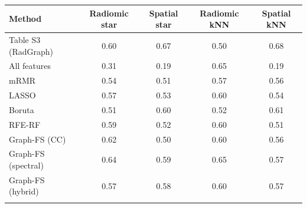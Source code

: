 \begin{tabular}{@{}lcccc@{}}
\toprule
Method & Radiomic star & Spatial star & Radiomic kNN & Spatial kNN \\
\midrule
Table S3 (RadGraph) & 0.60 & 0.67 & 0.50 & 0.68 \\
All features & 0.31 & 0.19 & 0.65 & 0.19 \\
mRMR & 0.54 & 0.51 & 0.57 & 0.56 \\
LASSO & 0.57 & 0.53 & 0.60 & 0.54 \\
Boruta & 0.51 & 0.60 & 0.52 & 0.61 \\
RFE-RF & 0.59 & 0.52 & 0.60 & 0.51 \\
Graph-FS (CC) & 0.62 & 0.50 & 0.60 & 0.56 \\
Graph-FS (spectral) & 0.64 & 0.59 & 0.65 & 0.57 \\
Graph-FS (hybrid) & 0.57 & 0.58 & 0.60 & 0.57 \\
\botrule
\end{tabular}
